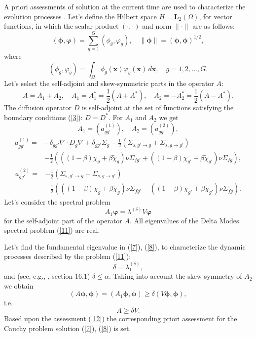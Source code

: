 \documentclass[authoryear]{elsarticle}
\begin{document}
A priori assessments of solution at the current time are used to characterize the evolution processes \cite{bookEvans}. Let’s define the Hilbert space $H = \bm L_2(\Omega)$, for vector functions, in which the scalar product $(\cdot, \cdot)$  and norm $\|\cdot \|$ are as follows:
\[
 (\bm \phi , \bm \varphi) = \sum_{g=1}^{G} (\phi_g, \varphi_g) ,
 \quad \|\bm \phi \| = (\bm \phi , \bm \phi)^{1/2} ,
\] 
where
\[
 (\phi_g, \varphi_g) = \int_{\Omega} \phi_g (\bm x) \varphi_g (\bm x) \, d \bm x ,
 \quad g = 1,2, ..., G . 
\] 
Let’s select the self-adjoint and skew-symmetric parts in the operator $A$:
\[
 A = A_1 + A_2, 
 \quad A_1 = A_1^* = \frac{1}{2} (A + A^*), 
 \quad A_2 = - A_2^* = \frac{1}{2} (A - A^*) .
\]
The diffusion operator $D$ is self-adjoint at the set of functions satisfying the boundary conditions (\ref{3}): $D = D^*$. For $A_1$ and $A_2$ we get
\[
 A_1 = (a^{(1)}_{g g'}), 
 \quad A_2 = (a^{(2)}_{g g'}),
\]
\[
\begin{split}
 a^{(1)}_{g g'} = & - \delta_{g g'} \nabla \cdot D_g \nabla
 +  \delta_{g g'} \Sigma_g 
 -  \frac{1}{2} \left ( \Sigma_{s,g'\rightarrow g} + \Sigma_{s,g\rightarrow g'} \right ) \\
 & - \frac{1}{2} \left ( ( (1-\beta) \chi_g + \beta \widetilde{\chi}_g) \nu \Sigma_{fg'} 
 + ( (1-\beta) \chi_{g'} + \beta \widetilde{\chi}_{g'}) \nu \Sigma_{fg} \right ) ,
\end{split}
\] 
\[
\begin{split}
  a^{(2)}_{g g'} = & - 
 \frac{1}{2} \left ( \Sigma_{s,g'\rightarrow g} - \Sigma_{s,g\rightarrow g'} \right ) \\
 & - \frac{1}{2} \left ( ( (1-\beta) \chi_g + \beta \widetilde{\chi}_g) \nu \Sigma_{fg'} 
 - ( (1-\beta) \chi_{g'} + \beta \widetilde{\chi}_{g'}) \nu \Sigma_{fg} \right ) .
\end{split}
\] 
Let’s consider the spectral problem
\begin{equation}\label{11}
 A_1 \bm \varphi  =  \lambda^{(\delta)} V \bm \varphi 
\end{equation} 
for the self-adjoint part of the operator $A$. All eigenvalues of the Delta Modes spectral problem (\ref{11}) are real.

Let’s find the fundamental eigenvalue in (\ref{7}), (\ref{8}), to characterize the dynamic processes described by the problem (\ref{11}):
\[
  \delta  = \lambda^{(\delta )}_1,
\] 
and (see, e.g., \cite{Hogben}, section 16.1) $\delta  \leq \alpha$.
Taking into account the skew-symmetry of $A_2$  we obtain
\[
 (A \bm \phi, \bm \phi) = (A_1 \bm \phi, \bm \phi) \geq \delta  (V \bm \phi,\bm \phi),
\] 
i.e.
\begin{equation}\label{12}
 A \geq \delta V . 
\end{equation} 
Based upon the assessment (\ref{12}) the corresponding priori assessment for the Cauchy problem solution (\ref{7}), (\ref{8}) is set. 
\end{document}
